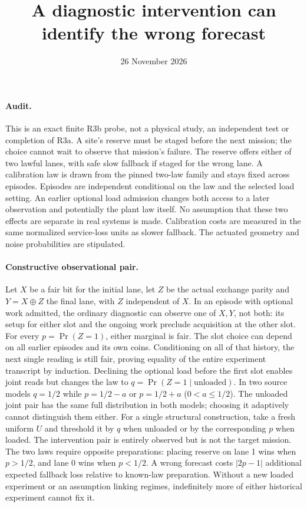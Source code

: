 \documentclass{article}
\title{A diagnostic intervention can identify the wrong forecast}
\author{}
\date{26 November 2026}
\begin{document}
\maketitle

\paragraph{Audit.}
This is an exact finite R3b probe, not a physical study, an independent
test or completion of R3a. A site's reserve must be staged before the
next mission; the choice cannot wait to observe that mission's failure.
The reserve offers either of two lawful lanes, with safe slow fallback
if staged for the wrong lane. A calibration law is drawn from the pinned
two-law family and stays fixed across episodes. Episodes are independent
conditional on the law and the selected load setting.
An earlier optional load admission changes both access to a later observation
and potentially the plant law itself. No assumption that these two effects
are separate in real systems is made. Calibration costs are measured in
the same normalized service-loss units as slower fallback. The actuated
geometry and noise probabilities are stipulated.

\paragraph{Constructive observational pair.}
Let $X$ be a fair bit for the initial lane, let $Z$ be the actual
exchange parity and $Y=X\oplus Z$ the final lane, with $Z$ independent
of $X$. In an episode with optional work admitted, the ordinary
diagnostic can observe one of $X,Y$, not both: its setup for either
slot and the ongoing work preclude acquisition at the other slot.
For every $p=\Pr(Z=1)$, either marginal is fair. The slot choice can
depend on all earlier episodes and its own coins. Conditioning on all
of that history, the next single reading is still fair, proving equality
of the entire experiment transcript by induction.
Declining the optional load before the first slot enables joint reads
but changes the law to $q=\Pr(Z=1\mid\text{unloaded})$. In two source
models $q=1/2$ while $p=1/2-a$ or $p=1/2+a$ ($0<a\le1/2$).
The unloaded joint pair has the same full distribution in both models;
choosing it adaptively cannot distinguish them either. For a single
structural construction, take a fresh uniform $U$ and threshold it by
$q$ when unloaded or by the corresponding $p$ when loaded.
The intervention pair is entirely observed but is not the target mission.
The two laws require opposite preparations: placing reserve on lane 1
wins when $p>1/2$, and lane 0 wins when $p<1/2$. A wrong forecast
costs $|2p-1|$ additional expected fallback loss relative to known-law
preparation. Without a new loaded experiment or an assumption linking
regimes, indefinitely more of either historical experiment cannot fix it.
\end{document}
